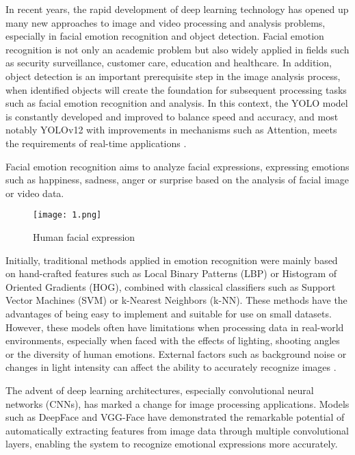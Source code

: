 \documentclass[a4paper,13pt]{report}
\begin{document}
In recent years, the rapid development of deep learning technology has opened up many new approaches to image and video processing and analysis problems, especially in facial emotion recognition and object detection. Facial emotion recognition is not only an academic problem but also widely applied in fields such as security surveillance, customer care, education and healthcare. In addition, object detection is an important prerequisite step in the image analysis process, when identified objects will create the foundation for subsequent processing tasks such as facial emotion recognition and analysis. In this context, the YOLO model is constantly developed and improved to balance speed and accuracy, and most notably YOLOv12 with improvements in mechanisms such as Attention, meets the requirements of real-time applications \cite{alizadeh2017}. 

Facial emotion recognition aims to analyze facial expressions, expressing emotions such as happiness, sadness, anger or surprise based on the analysis of facial image or video data.

\begin{figure}[H]
  \centering
  \texttt{[image: 1.png]}
  \caption{Human facial expression}
  \label{fig:lit}
\end{figure}

Initially, traditional methods applied in emotion recognition were mainly based on hand-crafted features such as Local Binary Patterns (LBP) or Histogram of Oriented Gradients (HOG), combined with classical classifiers such as Support Vector Machines (SVM) or k-Nearest Neighbors (k-NN). These methods have the advantages of being easy to implement and suitable for use on small datasets. However, these models often have limitations when processing data in real-world environments, especially when faced with the effects of lighting, shooting angles or the diversity of human emotions. External factors such as background noise or changes in light intensity can affect the ability to accurately recognize images \cite{kaushik2017}. 

The advent of deep learning architectures, especially convolutional neural networks (CNNs), has marked a change for image processing applications. Models such as DeepFace and VGG-Face have demonstrated the remarkable potential of automatically extracting features from image data through multiple convolutional layers, enabling the system to recognize emotional expressions more accurately.
\end{document}

